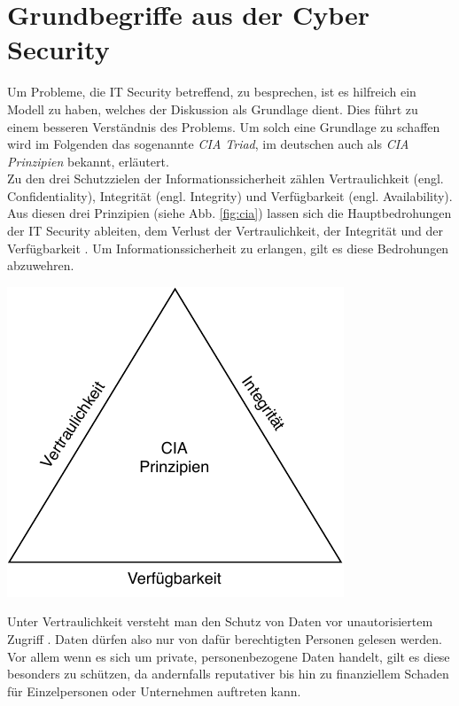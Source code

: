 \documentclass[
    12pt, %
    DIV10,
    ngerman, %
    a4paper, %
    oneside, %
    titlepage, %
    parskip=half, %
    headings=normal, %
    listof=totoc, %
    bibliography=totoc, %
    index=totoc, %
    captions=tableheading, %
    final %
]{scrreprt}
\begin{document}
\section{Grundbegriffe aus der Cyber Security}
Um Probleme, die IT Security betreffend, zu besprechen, ist es hilfreich ein Modell zu haben, welches der Diskussion als Grundlage  dient. Dies führt zu einem besseren Verständnis des Problems. Um solch eine Grundlage zu schaffen wird im Folgenden das sogenannte \emph{CIA Triad}, im deutschen auch als \emph{CIA Prinzipien} bekannt, erläutert.\\
Zu den drei Schutzzielen der Informationssicherheit zählen Vertraulichkeit (engl. Confidentiality), Integrität (engl. Integrity) und Verfügbarkeit (engl. Availability). Aus diesen drei Prinzipien (siehe Abb. \ref{fig:cia}) lassen sich die Hauptbedrohungen der IT Security ableiten, dem Verlust der Vertraulichkeit, der Integrität und der Verfügbarkeit \parencite{Andress2019}.
Um Informationssicherheit zu erlangen, gilt es diese Bedrohungen abzuwehren.
\begin{center}
\includegraphics[scale=0.8]{img/cia.pdf}
\label{fig:cia}
\end{center}
Unter Vertraulichkeit versteht man den Schutz von Daten vor unautorisiertem Zugriff \parencite{ingeno2018software}. Daten dürfen also nur von dafür berechtigten Personen gelesen werden. Vor allem wenn es sich um private, personenbezogene Daten handelt, gilt es diese besonders zu schützen, da andernfalls reputativer bis hin zu finanziellem Schaden für Einzelpersonen oder Unternehmen auftreten kann.\\
\end{document}
